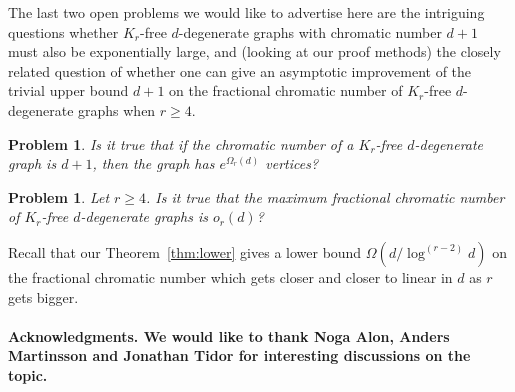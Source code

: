 \documentclass[10pt]{amsart}
\newtheorem{problem}[theorem]{Problem}
\theoremstyle{definition}
\begin{document}
The last two open problems we would like to advertise here are the intriguing questions whether $K_r$-free $d$-degenerate graphs with chromatic number $d+1$ must also be exponentially large, and (looking at our proof methods) the closely related question of whether one can give an asymptotic improvement of the trivial upper bound $d+1$ on the fractional chromatic number of $K_r$-free $d$-degenerate graphs when $r\ge 4$. 
\begin{problem}
    \label{conj:main-kr}
    Is it true that if the chromatic number of a $K_r$-free $d$-degenerate graph is $d + 1$, then the graph has $e^{\Omega_r(d)}$ vertices?
\end{problem}
\begin{problem}
    \label{conj:harris-kr}
    Let $r\ge 4$. Is it true that the maximum fractional chromatic number of $K_r$-free $d$-degenerate graphs is $o_r(d)$?
\end{problem}
Recall that our Theorem~\ref{thm:lower} gives a lower bound $\Omega(d/\log^{(r-2)}d)$ on the fractional chromatic number which gets closer and closer to linear in $d$ as $r$ gets bigger.

\medskip

\paragraph*{\textbf{Acknowledgments.} We would like to thank Noga Alon, Anders Martinsson and Jonathan Tidor for interesting discussions on the topic.}


\end{document}
